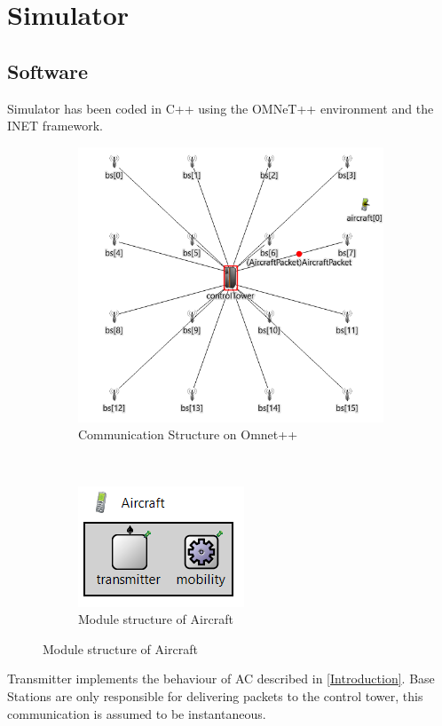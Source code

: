 \documentclass[a4paper,12pt]{article}
\begin{document}

\section{Simulator}
\subsection{Software}
Simulator has been coded in C++ using the OMNeT++ environment and the INET framework.
\begin{figure}[H]
  \centering
  \begin{subfigure}[b]{0.45\textwidth}
    \centering
    \includegraphics[scale=0.7]{img/Implementation.png}
    \caption{Communication Structure on Omnet++}
    \label{fig:aircraft-ned}
  \end{subfigure}
  ~
  \begin{subfigure}[b]{0.45\textwidth}
      \centering
      \includegraphics{img/aircraft-ned.png}
      \caption{Module structure of Aircraft}
      \label{fig:aircraft-ned}
  \end{subfigure}
\end{figure}
Transmitter implements the behaviour of AC described in \ref{Introduction}. Base Stations are only responsible for delivering packets to the control tower,
this communication is assumed to be instantaneous.  
\end{document}

